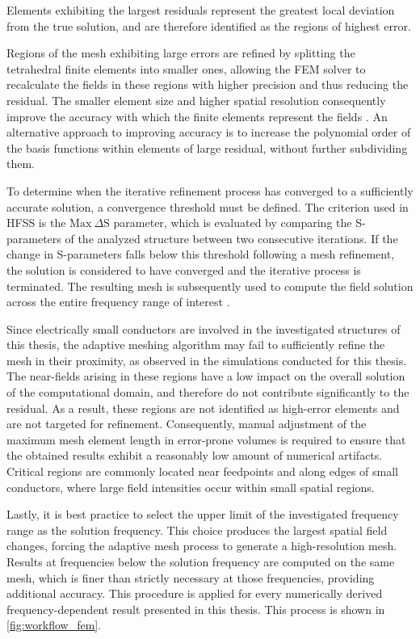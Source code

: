 Elements exhibiting the largest residuals represent the greatest local deviation from the true solution, and are therefore identified as the regions of highest error.

Regions of the mesh exhibiting large errors are refined by splitting the tetrahedral finite elements into smaller ones, allowing the FEM solver to recalculate the fields in these regions with higher precision and thus reducing the residual. The smaller element size and higher spatial resolution consequently improve the accuracy with which the finite elements represent the fields \cite{1063929}. An alternative approach to improving accuracy is to increase the polynomial order of the basis functions within elements of large residual, without further subdividing them.

To determine when the iterative refinement process has converged to a sufficiently accurate solution, a convergence threshold must be defined. The criterion used in HFSS is the $\mathrm{Max}\ \Delta \mathrm{S}$ parameter, which is evaluated by comparing the S-parameters of the analyzed structure between two consecutive iterations. If the change in S-parameters falls below this threshold following a mesh refinement, the solution is considered to have converged and the iterative process is terminated. The resulting mesh is subsequently used to compute the field solution across the entire frequency range of interest \cite{kopp_hfss}.

Since electrically small conductors are involved in the investigated structures of this thesis, the adaptive meshing algorithm may fail to sufficiently refine the mesh in their proximity, as observed in the simulations conducted for this thesis. The near-fields arising in these regions have a low impact on the overall solution of the computational domain, and therefore do not contribute significantly to the residual. As a result, these regions are not identified as high-error elements and are not targeted for refinement. Consequently, manual adjustment of the maximum mesh element length in error-prone volumes is required to ensure that the obtained results exhibit a reasonably low amount of numerical artifacts. Critical regions are commonly located near feedpoints and along edges of small conductors, where large field intensities occur within small spatial regions.

Lastly, it is best practice to select the upper limit of the investigated frequency range as the solution frequency. This choice produces the largest spatial field changes, forcing the adaptive mesh process to generate a high-resolution mesh. Results at frequencies below the solution frequency are computed on the same mesh, which is finer than strictly necessary at those frequencies, providing additional accuracy. This procedure is applied for every numerically derived frequency-dependent result presented in this thesis. This process is shown in \autoref{fig:workflow_fem}.

